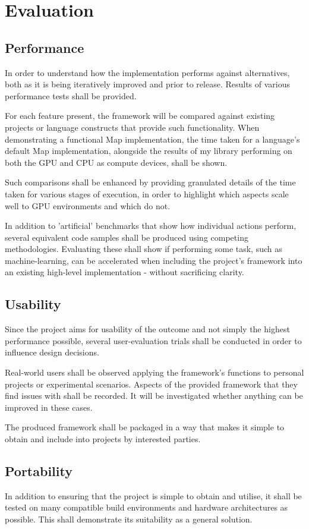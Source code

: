 \section{Evaluation}
\subsection{Performance}
In order to understand how the implementation performs against alternatives, both as it is being iteratively improved and prior to release. Results of various performance tests shall be provided.

For each feature present, the framework will be compared against existing projects or language constructs that provide such functionality. When demonstrating a functional Map implementation, the time taken for a language's default Map implementation, alongside the results of my library performing on both the GPU and CPU as compute devices, shall be shown.

Such comparisons shall be enhanced by providing granulated details of the time taken for various stages of execution, in order to highlight which aspects scale well to GPU environments and which do not.

In addition to 'artificial' benchmarks that show how individual actions perform, several equivalent code samples shall be produced using competing methodologies. Evaluating these shall show if performing some task, such as machine-learning, can be accelerated when including the project's framework into an existing high-level implementation - without sacrificing clarity.
\subsection{Usability}
Since the project aims for usability of the outcome and not simply the highest performance possible, several user-evaluation trials shall be conducted in order to influence design decisions.

Real-world users shall be observed applying the framework's functions to personal projects or experimental scenarios. Aspects of the provided framework that they find issues with shall be recorded. It will be investigated whether anything can be improved in these cases.

The produced framework shall be packaged in a way that makes it simple to obtain and include into projects by interested parties.
\subsection{Portability}
In addition to ensuring that the project is simple to obtain and utilise, it shall be tested on many compatible build environments and hardware architectures as possible. This shall demonstrate its suitability as a general solution.

